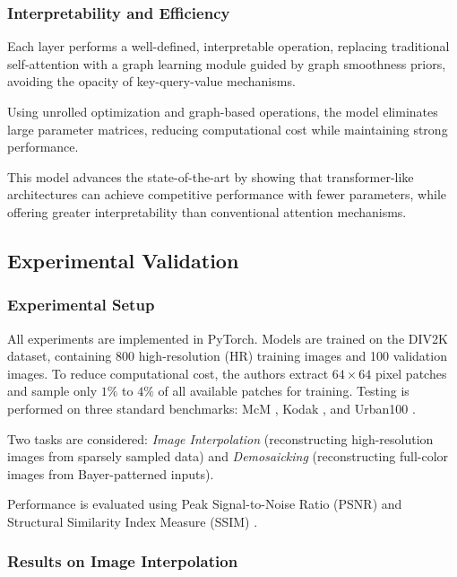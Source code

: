 \documentclass{article}
\theoremstyle{plain}
\theoremstyle{definition}
\theoremstyle{remark}
\begin{document}
\subsubsection{Interpretability and Efficiency}

Each layer performs a well-defined, interpretable operation, replacing traditional self-attention with a graph learning module guided by graph smoothness priors, avoiding the opacity of key-query-value mechanisms.

Using unrolled optimization and graph-based operations, the model eliminates large parameter matrices, reducing computational cost while maintaining strong performance.

This model advances the state-of-the-art by showing that transformer-like architectures can achieve competitive performance with fewer parameters, while offering greater interpretability than conventional attention mechanisms.

\subsection{Experimental Validation}

\subsubsection{Experimental Setup}

All experiments are implemented in PyTorch. Models are trained on the DIV2K dataset, containing 800 high-resolution (HR) training images and 100 validation images. To reduce computational cost, the authors extract $64 \times 64$ pixel patches and sample only $1\%$ to $4\%$ of all available patches for training. Testing is performed on three standard benchmarks: McM \cite{zhang2011color}, Kodak \cite{kodak1993}, and Urban100 \cite{huang2015single}.

Two tasks are considered: \textit{Image Interpolation} (reconstructing high-resolution images from sparsely sampled data) and \textit{Demosaicking} (reconstructing full-color images from Bayer-patterned inputs).

Performance is evaluated using Peak Signal-to-Noise Ratio (PSNR) and Structural Similarity Index Measure (SSIM) \cite{wang2004image}.

\subsubsection{Results on Image Interpolation}
\end{document}
